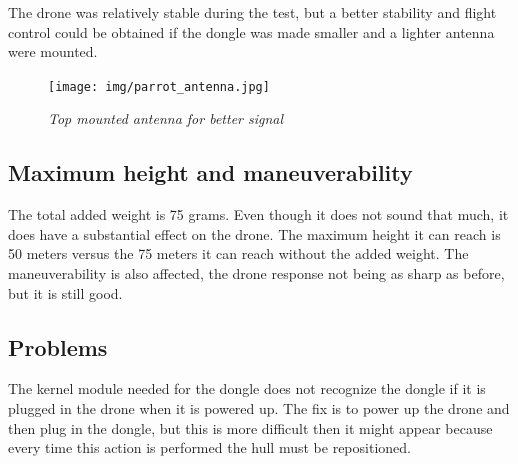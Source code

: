 The drone was relatively stable during the test, but a better stability and flight control could be obtained if the dongle was made smaller and a lighter antenna were mounted.


\begin{figure}[ht]
\begin{center}
\texttt{[image: img/parrot\_antenna.jpg]}
\end{center}
\caption{\small \itshape{Top mounted antenna for better signal}}
\end{figure}

\subsection{Maximum height and maneuverability}

The total added weight is 75 grams. Even though it does not sound that much, it does have a substantial effect on the drone. The maximum height it can reach is 50 meters versus the 75 meters it can reach without the added weight. The maneuverability is also affected, the drone response not being as sharp as before, but it is still good.

\subsection{Problems}

The kernel module needed for the dongle does not recognize the dongle if it is plugged in the drone when it is powered up. The fix is to power up the drone and then plug in the dongle, but this is more difficult then it might appear because every time this action is performed the hull must be repositioned.

\clearpage
